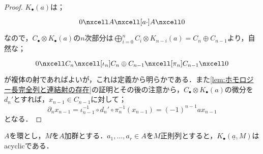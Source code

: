 \begin{proof}
	$K_\bullet(a)$は；
	\[\begin{tikzcd}
	0\nxcell A\nxcell[a\cdot]A\nxcell0
	\end{tikzcd}\]
	なので，$C_\bullet\otimes K_\bullet(a)$の$n$次部分は$\bigoplus_{i=0}^n C_{i}\otimes K_{n-i}(a)=C_n\oplus C_{n-1}$より，自然な；
	\[\begin{tikzcd}
	0\nxcell C_n\nxcell[\iota_n] C_n\oplus C_{n-1}\nxcell[\pi_n] C_{n-1}\nxcell0
	\end{tikzcd}\]
	が複体の射であればよいが，これは定義から明らかである．また\ref{lem:ホモロジー長完全列と連結射の存在}の証明とその後の注意から，$C_\bullet\otimes K_\bullet(a)$の微分を$d_n'$とすれば，$x_{n-1}\in C_{n-1}$に対して；
	\[\partial_n{x_{n-1}}=\iota_{n-1}^{-1}\circ d_n'\circ\pi_n^{-1}(x_{n-1})=(-1)^{n-1}ax_{n-1}\]
	となる．
\end{proof}

%

\begin{prop}
	$A$を環とし，$M$を$A$加群とする．$a_1,\dots,a_r\in A$を$M$正則列とすると，$K_\bullet(\underline{a},M)$はacyclicである．
\end{prop}


